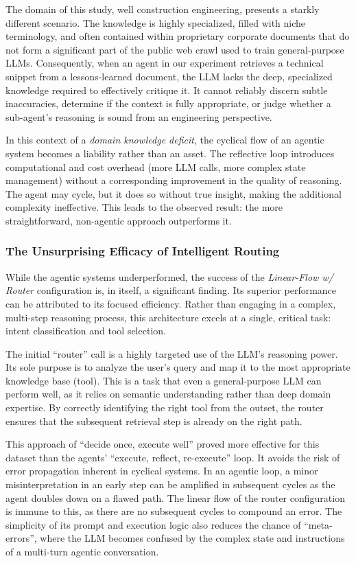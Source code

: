             The domain of this study, well construction engineering, presents a starkly different scenario. The knowledge is highly specialized, filled with niche terminology, and often contained within proprietary corporate documents that do not form a significant part of the public web crawl used to train general-purpose LLMs. Consequently, when an agent in our experiment retrieves a technical snippet from a lessons-learned document, the LLM lacks the deep, specialized knowledge required to effectively critique it. It cannot reliably discern subtle inaccuracies, determine if the context is fully appropriate, or judge whether a sub-agent's reasoning is sound from an engineering perspective.
            
            In this context of a \textit{domain knowledge deficit}, the cyclical flow of an agentic system becomes a liability rather than an asset. The reflective loop introduces computational and cost overhead (more LLM calls, more complex state management) without a corresponding improvement in the quality of reasoning. The agent may cycle, but it does so without true insight, making the additional complexity ineffective. This leads to the observed result: the more straightforward, non-agentic approach outperforms it.
        
        \subsubsection{The Unsurprising Efficacy of Intelligent Routing}
            
            While the agentic systems underperformed, the success of the \textit{Linear-Flow w/ Router} configuration is, in itself, a significant finding. Its superior performance can be attributed to its focused efficiency. Rather than engaging in a complex, multi-step reasoning process, this architecture excels at a single, critical task: intent classification and tool selection.
            
            The initial ``router'' call is a highly targeted use of the LLM's reasoning power. Its sole purpose is to analyze the user's query and map it to the most appropriate knowledge base (tool). This is a task that even a general-purpose LLM can perform well, as it relies on semantic understanding rather than deep domain expertise. By correctly identifying the right tool from the outset, the router ensures that the subsequent retrieval step is already on the right path.
            
            This approach of ``decide once, execute well'' proved more effective for this dataset than the agents' ``execute, reflect, re-execute'' loop. It avoids the risk of error propagation inherent in cyclical systems. In an agentic loop, a minor misinterpretation in an early step can be amplified in subsequent cycles as the agent doubles down on a flawed path. The linear flow of the router configuration is immune to this, as there are no subsequent cycles to compound an error. The simplicity of its prompt and execution logic also reduces the chance of ``meta-errors'', where the LLM becomes confused by the complex state and instructions of a multi-turn agentic conversation.
        
